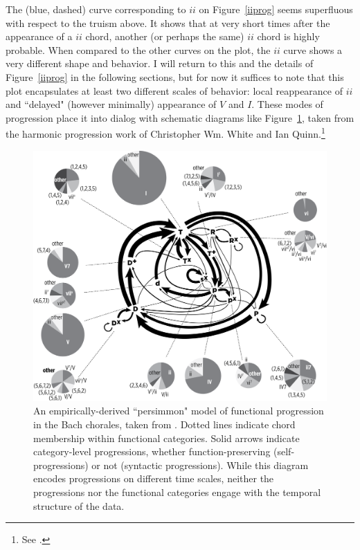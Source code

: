 The (blue, dashed) curve corresponding to $ii$ on Figure~\ref{iiprog} seems superfluous with respect to the truism above.  It shows that at very short times after the appearance of a $ii$ chord, another (or perhaps the same) $ii$ chord is highly probable.  When compared to the other curves on the plot, the $ii$ curve shows a very different shape and behavior.  I will return to this and the details of Figure~\ref{iiprog} in the following sections, but for now it suffices to note that this plot encapsulates at least two different scales of behavior: local reappearance of $ii$ and ``delayed" (however minimally) appearance of $V$ and $I$.  These modes of progression place it into dialog with schematic diagrams like Figure~\ref{pers}, taken from the harmonic progression work of Christopher Wm. White and Ian Quinn.\footnote{See \cite{wq2017}.}

\begin{figure}
	\centering
	\includegraphics[width=5.5in]{WhiteQuinn_NewPersimmon.png}
	\caption{An empirically-derived ``persimmon" model of functional progression in the Bach chorales, taken from \cite{wq2017}.  Dotted lines indicate chord membership within functional categories.  Solid arrows indicate category-level progressions, whether function-preserving (self-progressions) or not (syntactic progressions).  While this diagram encodes progressions on different time scales, neither the progressions nor the functional categories engage with the temporal structure of the data.}
	\label{pers}
\end{figure}

